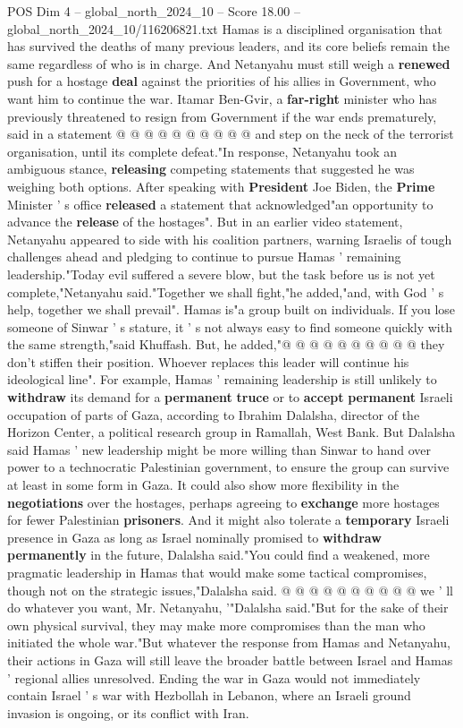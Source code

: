 \begin{textsample}{POS Dim 4 – global\_north\_2024\_10 – Score 18.00 – global\_north\_2024\_10/116206821.txt}
Hamas is a disciplined organisation that has survived the deaths of many previous leaders, and its core beliefs remain the same regardless of who is in charge.
And Netanyahu must still weigh a \textbf{renewed} push for a hostage \textbf{deal} against the priorities of his allies in Government, who want him to continue the war.
Itamar Ben-Gvir, a \textbf{far-right} minister who has previously threatened to resign from Government if the war ends prematurely, said in a statement @ @ @ @ @ @ @ @ @ @ and step on the neck of the terrorist organisation, until its complete defeat."In response, Netanyahu took an ambiguous stance, \textbf{releasing} competing statements that suggested he was weighing both options.
After speaking with \textbf{President} Joe Biden, the \textbf{Prime} Minister ' s office \textbf{released} a statement that acknowledged"an opportunity to advance the \textbf{release} of the hostages".
But in an earlier video statement, Netanyahu appeared to side with his coalition partners, warning Israelis of tough challenges ahead and pledging to continue to pursue Hamas ' remaining leadership."Today evil suffered a severe blow, but the task before us is not yet complete,"Netanyahu said."Together we shall fight,"he added,"and, with God ' s help, together we shall prevail".
Hamas is"a group built on individuals.
If you lose someone of Sinwar ' s stature, it ' s not always easy to find someone quickly with the same strength,"said Khuffash.
But, he added,"@ @ @ @ @ @ @ @ @ @ they don't stiffen their position.
Whoever replaces this leader will continue his ideological line".
For example, Hamas ' remaining leadership is still unlikely to \textbf{withdraw} its demand for a \textbf{permanent} \textbf{truce} or to \textbf{accept} \textbf{permanent} Israeli occupation of parts of Gaza, according to Ibrahim Dalalsha, director of the Horizon Center, a political research group in Ramallah, West Bank.
But Dalalsha said Hamas ' new leadership might be more willing than Sinwar to hand over power to a technocratic Palestinian government, to ensure the group can survive at least in some form in Gaza.
It could also show more flexibility in the \textbf{negotiations} over the hostages, perhaps agreeing to \textbf{exchange} more hostages for fewer Palestinian \textbf{prisoners}.
And it might also tolerate a \textbf{temporary} Israeli presence in Gaza as long as Israel nominally promised to \textbf{withdraw} \textbf{permanently} in the future, Dalalsha said."You could find a weakened, more pragmatic leadership in Hamas that would make some tactical compromises, though not on the strategic issues,"Dalalsha said. @ @ @ @ @ @ @ @ @ @ we ' ll do whatever you want, Mr.
Netanyahu, '"Dalalsha said."But for the sake of their own physical survival, they may make more compromises than the man who initiated the whole war."But whatever the response from Hamas and Netanyahu, their actions in Gaza will still leave the broader battle between Israel and Hamas ' regional allies unresolved.
Ending the war in Gaza would not immediately contain Israel ' s war with Hezbollah in Lebanon, where an Israeli ground invasion is ongoing, or its conflict with Iran.


\end{textsample}
